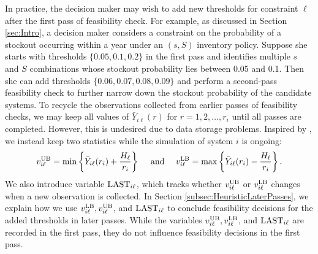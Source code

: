 \documentclass[11pt]{article}
\begin{document}
In practice, the decision maker may wish to add new thresholds for constraint $\ell$ after the first pass of feasibility check. For example, as discussed in Section \ref{sec:Intro}, a decision maker considers a constraint on the probability of a stockout occurring within a year under an $(s, S)$ inventory policy. Suppose she starts with thresholds $\{0.05, 0.1, 0.2\}$ in the first pass and identifies multiple $s$ and $S$ combinations whose stockout probability lies between 0.05 and 0.1. Then she can add thresholds $\{0.06, 0.07, 0.08, 0.09\}$ and perform a second-pass feasibility check to further narrow down the stockout probability of the candidate systems.
To recycle the observations collected from earlier passes of feasibility checks, we may keep all values of $\bar{Y}_{i\ell}(r)$ for $r=1,2,\ldots,r_i$ until all passes are completed. However, this is undesired due to data storage problems. Inspired by \citet{Zhou2024}, we instead keep two statistics while the simulation of system $i$ is ongoing: 
\begin{equation*}
    v_{i\ell}^{\rm UB} = \min \left\{\bar{Y}_{i\ell}(r_i)+\frac{H_\ell}{r_i} \right\} \quad \text{ and } \quad
    v_{i\ell}^{\rm LB} = \max \left\{\bar{Y}_{i\ell}(r_i)-\frac{H_\ell}{r_i} \right\}.
\end{equation*}
We also introduce variable ${\rm LAST}_{i\ell}$, which tracks whether $v_{i\ell}^{\rm UB}$ or $v_{i\ell}^{\rm LB}$ changes when a new observation is collected. 
In Section \ref{subsec:HeuristicLaterPasses}, we explain how we use $v_{i\ell}^{\rm LB},v_{i\ell}^{\rm UB}$, and ${\rm LAST}_{i\ell}$ to conclude feasibility decisions for the added thresholds in later passes. 
While the variables $v_{i\ell}^{\rm UB},v_{i\ell}^{\rm LB}$, and ${\rm LAST}_{i\ell}$ are recorded in the first pass, they do not influence feasibility decisions in the first pass.
\end{document}
